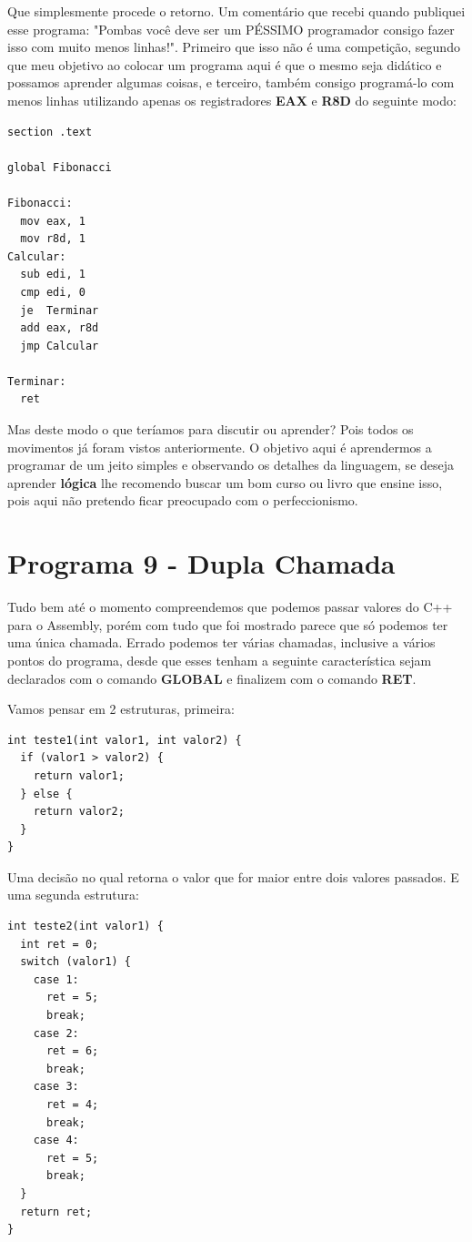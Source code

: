 Que simplesmente procede o retorno. Um comentário que recebi quando publiquei esse programa: "Pombas você deve ser um PÉSSIMO programador consigo fazer isso com muito menos linhas!". Primeiro que isso não é uma competição, segundo que meu objetivo ao colocar um programa aqui é que o mesmo seja didático e possamos aprender algumas coisas, e terceiro, também consigo programá-lo com menos linhas utilizando apenas os registradores \textbf{EAX} e \textbf{R8D} do seguinte modo:
\begin{lstlisting}[]
section .text

global Fibonacci

Fibonacci:
  mov eax, 1
  mov r8d, 1
Calcular:
  sub edi, 1 
  cmp edi, 0
  je  Terminar
  add eax, r8d
  jmp Calcular

Terminar:
  ret
\end{lstlisting}

Mas deste modo o que teríamos para discutir ou aprender? Pois todos os movimentos já foram vistos anteriormente. O objetivo aqui é aprendermos a programar de um jeito simples e observando os detalhes da linguagem, se deseja aprender \textbf{lógica} lhe recomendo buscar um bom curso ou livro que ensine isso, pois aqui não pretendo ficar preocupado com o perfeccionismo.

\section{Programa 9 - Dupla Chamada}
Tudo bem até o momento compreendemos que podemos passar valores do C++ para o Assembly, porém com tudo que foi mostrado parece que só podemos ter uma única chamada. Errado podemos ter várias chamadas, inclusive a vários pontos do programa, desde que esses tenham a seguinte característica sejam declarados com o comando \textbf{GLOBAL} e finalizem com o comando \textbf{RET}. 

Vamos pensar em 2 estruturas, primeira:
\begin{lstlisting}[]
int teste1(int valor1, int valor2) {
  if (valor1 > valor2) {
    return valor1;
  } else {
    return valor2;
  }
}
\end{lstlisting}

Uma decisão no qual retorna o valor que for maior entre dois valores passados. E uma segunda estrutura:
\begin{lstlisting}[]
int teste2(int valor1) {
  int ret = 0;
  switch (valor1) {
    case 1:
      ret = 5;
      break;
    case 2:
      ret = 6;
      break;
    case 3:
      ret = 4;
      break;
    case 4:
      ret = 5;
      break;
  }
  return ret;
}
\end{lstlisting}

